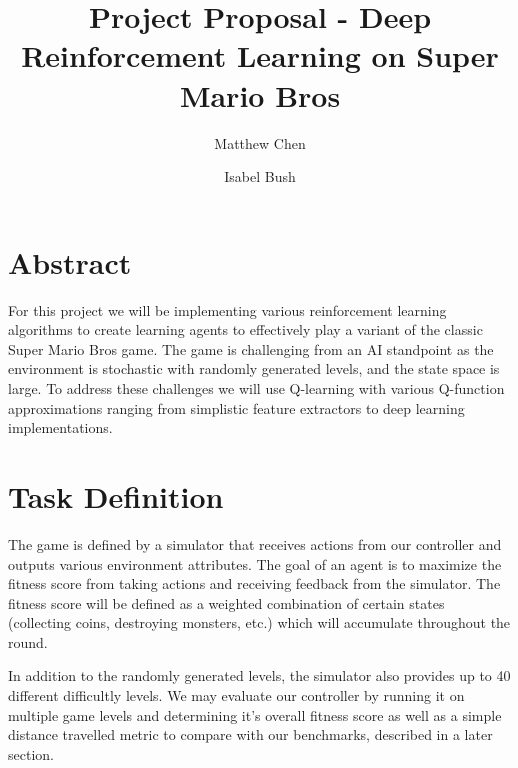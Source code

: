 \documentclass[12pt]{article}
\begin{document}
\nocite{*}

\title{Project Proposal - Deep Reinforcement Learning on Super Mario Bros}

\author{
  Matthew Chen
  \and
  Isabel Bush
}
\date{}
\maketitle


\section{Abstract}

For this project we will be implementing various reinforcement learning algorithms to create learning agents to effectively play a variant of the classic Super Mario Bros game. The game is challenging from an AI standpoint as the environment is stochastic with randomly generated levels, and the state space is large. To address these challenges we will use Q-learning with various Q-function approximations ranging from simplistic feature extractors to deep learning implementations.


\section{Task Definition}

The game is defined by a simulator that receives actions from our controller and outputs various environment attributes. The goal of an agent is to maximize the fitness score from taking actions and receiving feedback from the simulator. The fitness score will be defined as a weighted combination of certain states (collecting coins, destroying monsters, etc.) which will accumulate throughout the round.


In addition to the randomly generated levels, the simulator also provides up to 40 different difficultly levels. We may evaluate our controller by running it on multiple game levels and determining it's overall fitness score as well as a simple distance travelled metric to compare with our benchmarks, described in a later section.
\end{document}
